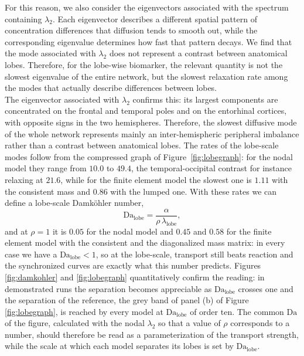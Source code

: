 For this reason, we also consider the eigenvectors associated with the spectrum containing $\lambda_2$. Each eigenvector describes a different spatial pattern of concentration differences that diffusion tends to smooth out, while the corresponding eigenvalue determines how fast that pattern decays. We find that the mode associated with $\lambda_2$ does not represent a contrast between anatomical lobes. Therefore, for the lobe-wise biomarker, the relevant quantity is not the slowest eigenvalue of the entire network, but the slowest relaxation rate among the modes that actually describe differences between lobes.\\
The eigenvector associated with $\lambda_2$ confirms this: its largest components are concentrated on the frontal and temporal poles and on the entorhinal cortices, with opposite signs in the two hemispheres. Therefore, the slowest diffusive mode of the whole network represents mainly an inter-hemispheric peripheral imbalance rather than a contrast between anatomical lobes. The rates of the lobe-scale modes follow from the compressed graph of Figure~\ref{fig:lobegraph}: for the nodal model they range from $10.0$ to $49.4$, the temporal-occipital contrast for instance relaxing at $21.6$, while for the finite element model the slowest one is $1.11$ with the consistent mass and $0.86$ with the lumped one. With these rates we can define a lobe-scale Damk\"ohler number,
\[
\mathrm{Da}_{\mathrm{lobe}} = \frac{\alpha}{\rho\,\lambda_{\mathrm{lobe}}},
\]
and at $\rho=1$ it is $0.05$ for the nodal model and $0.45$ and $0.58$ for the finite element model with the consistent and the diagonalized mass matrix: in every case we have a $\mathrm{Da}_{\mathrm{lobe}}<1$, so at the lobe-scale, transport still beats reaction and the synchronized curves are exactly what this number predicts. Figures \ref{fig:damkohler} and \ref{fig:lobegraph} quantitatively confirm the reading: in demonstrated runs the separation becomes appreciable as $\mathrm{Da}_{\mathrm{lobe}}$ crosses one and the separation of the reference, the grey band of panel (b) of Figure \ref{fig:lobegraph}, is reached by every model at $\mathrm{Da}_{\mathrm{lobe}}$ of order ten. The common $\mathrm{Da}$ of the figure, calculated with the nodal $\lambda_2$ so that a value of $\rho$ corresponds to a number, should therefore be read as a parameterization of the transport strength, while the scale at which each model separates its lobes is set by $\mathrm{Da}_{\mathrm{lobe}}$.


